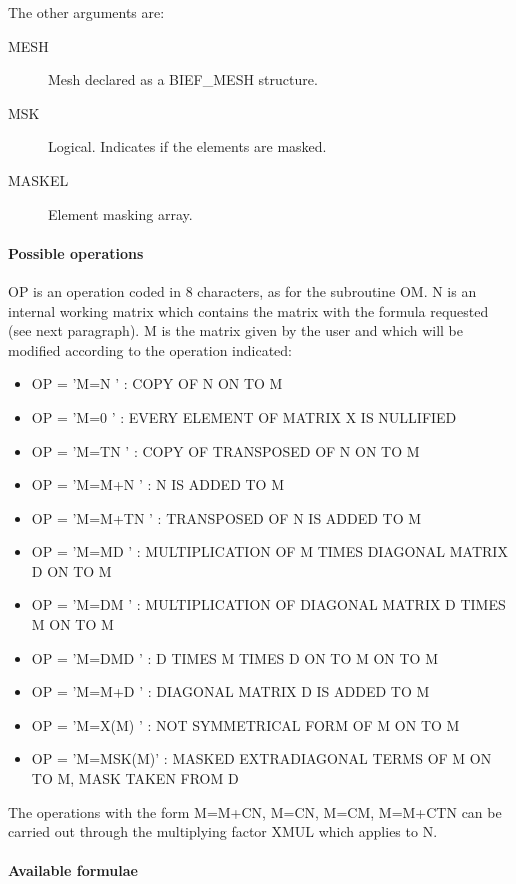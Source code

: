 The other arguments are:
\begin{description}
  \item [MESH] Mesh declared as a BIEF\_MESH structure.
  \item [MSK] Logical. Indicates if the elements are masked.
  \item [MASKEL] Element masking array.
\end{description}

\paragraph{Possible operations}

OP is an operation coded in 8 characters, as for the subroutine OM. N is an
internal working matrix which contains the matrix with the formula requested
(see next paragraph). M is the matrix given by the user and which will be
modified according to the operation indicated:

\begin{itemize}
  \item OP = 'M=N     ' : COPY OF N ON TO M
  \item OP = 'M=0     ' : EVERY ELEMENT OF MATRIX X IS NULLIFIED
  \item OP = 'M=TN    ' : COPY OF TRANSPOSED OF N ON TO M
  \item OP = 'M=M+N   ' : N IS ADDED TO M
  \item OP = 'M=M+TN  ' : TRANSPOSED OF N IS ADDED TO M
  \item OP = 'M=MD    ' : MULTIPLICATION OF M TIMES DIAGONAL MATRIX D ON TO M
  \item OP = 'M=DM    ' : MULTIPLICATION OF DIAGONAL MATRIX D TIMES M ON TO M
  \item OP = 'M=DMD   ' : D TIMES M TIMES D ON TO M ON TO M
  \item OP = 'M=M+D   ' : DIAGONAL MATRIX D IS ADDED TO M
  \item OP = 'M=X(M)  ' : NOT SYMMETRICAL FORM OF M ON TO M
  \item OP = 'M=MSK(M)' : MASKED EXTRADIAGONAL TERMS OF M ON TO M, MASK TAKEN
FROM D
\end{itemize}

The operations with the form M=M+CN, M=CN, M=CM, M=M+CTN
can be carried out through the multiplying
factor XMUL which applies to N.

\paragraph{Available formulae}

